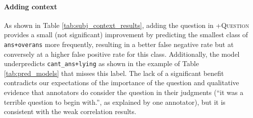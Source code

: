 
\begin{table}[]
    \centering
    \caption{Model predictions as context is added, with incorrect labels in {\color{red}{red}}. In this example, adding the question creates a false negative, but adding the sentiments create a true negative. With both contexts, the model predicts the entire label set correctly.}
    \label{tab:pred_models}

\end{table}
\paragraph{Adding context} As shown in Table \ref{tab:subj_context_results}, adding the question in \textsc{+Question} provides a small (not significant) improvement by predicting the smallest class of \texttt{ans+overans} more frequently, resulting in a better false negative rate but at conversely at a higher false positive rate for this class. Additionally, the model underpredicts \texttt{cant\_ans+lying} as shown in the example of Table \ref{tab:pred_models} that misses this label. The lack of a significant benefit contradicts our expectations of the importance of the question and qualitative evidence that annotators do consider the question in their judgments (``it was a terrible question to begin with.'', as explained by one annotator), but it is consistent with the weak correlation results.

